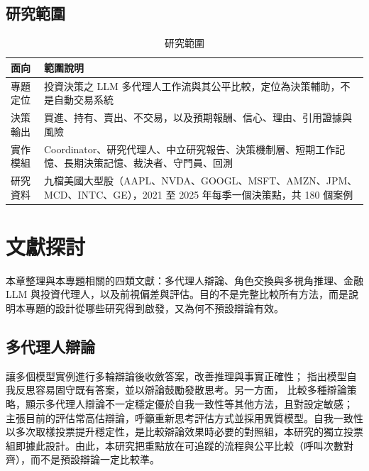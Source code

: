 \documentclass[12pt,a4paper]{article}
\begin{document}
\begin{CJK}{UTF8}{bkai}
\subsection{研究範圍}

\begin{table}[H]
\centering\small
\caption{研究範圍}
\label{tab:scope}
\begin{tabularx}{\textwidth}{@{}l Y@{}}
\toprule
面向 & 範圍說明 \\
\midrule
專題定位 & 投資決策之 LLM 多代理人工作流與其公平比較，定位為決策輔助，不是自動交易系統 \\
決策輸出 & 買進、持有、賣出、不交易，以及預期報酬、信心、理由、引用證據與風險 \\
實作模組 & Coordinator、研究代理人、中立研究報告、決策機制層、短期工作記憶、長期決策記憶、裁決者、守門員、回測 \\
研究資料 & 九檔美國大型股（AAPL、NVDA、GOOGL、MSFT、AMZN、JPM、MCD、INTC、GE），2021 至 2025 年每季一個決策點，共 180 個案例 \\
\bottomrule
\end{tabularx}
\end{table}

\section{文獻探討}
\label{sec:related}

本章整理與本專題相關的四類文獻：多代理人辯論、角色交換與多視角推理、金融 LLM 與投資代理人，以及前視偏差與評估。目的不是完整比較所有方法，而是說明本專題的設計從哪些研究得到啟發，又為何不預設辯論有效。

\subsection{多代理人辯論}

\citet{du2023debate} 讓多個模型實例進行多輪辯論後收斂答案，改善推理與事實正確性；\citet{liang2023divergent} 指出模型自我反思容易固守既有答案，並以辯論鼓勵發散思考。另一方面，\citet{smit2023mad} 比較多種辯論策略，顯示多代理人辯論不一定穩定優於自我一致性等其他方法，且對設定敏感；\citet{zhang2025stop} 主張目前的評估常高估辯論，呼籲重新思考評估方式並採用異質模型。自我一致性 \citep{wang2023selfconsistency} 以多次取樣投票提升穩定性，是比較辯論效果時必要的對照組，本研究的獨立投票組即據此設計。由此，本研究把重點放在可追蹤的流程與公平比較（呼叫次數對齊），而不是預設辯論一定比較準。


\end{CJK}
\end{document}
